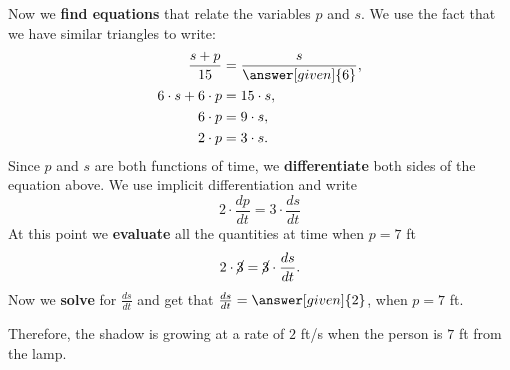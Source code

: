 \documentclass{ximera}
\begin{document}
\begin{example}
\begin{explanation}
    Now we \textbf{find equations} that relate the variables $p$ and $s$. We use the fact that we
    have similar triangles to write:
    \begin{align*}
      \frac{s+p}{15} &= \frac{s}{\answer[given]{6}},\\
      6\cdot s + 6 \cdot p &= 15\cdot s,\\
      6\cdot p &=9\cdot s,\\
      2\cdot p &=3 \cdot s.
    \end{align*}
    Since $p$ and $s$ are both functions of time, we
  \textbf{differentiate} both sides of the equation above. We  use
    implicit differentiation and write
        \[
    2\cdot \frac{dp}{dt} =3 \cdot \frac{ds}{dt}
    \]
    At this point we \textbf{evaluate} all the quantities at time when $p=7$ ft
    \[
    2\cdot \cancel{3} = \cancel{3} \cdot \frac{ds}{dt}.
    \]
    Now we \textbf{solve} for  $\frac{ds}{dt}$ and get that
     $\frac{ds}{dt}= \answer[given]{2}$, when $p=7$ ft.

      Therefore, the shadow is growing
    at a rate of $2$ ft/s when the person is $7$ ft from the lamp.\\
  \end{explanation}
\end{example}
\end{document}
